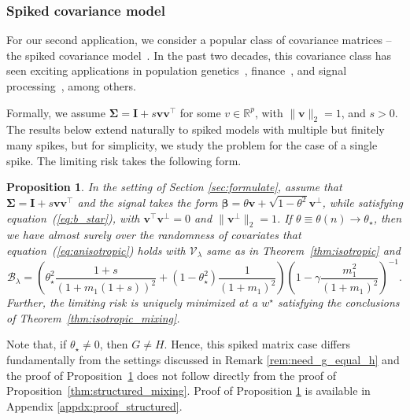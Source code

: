 \documentclass[10pt]{article}
\def\eqref#1{equation~(\ref{#1})}
\newtheorem{prop}{Proposition}
\numberwithin{thm}{section}
\numberwithin{remark}{section}
\numberwithin{ex}{section}
\numberwithin{ass}{section}
\numberwithin{defn}{section}
\numberwithin{lemma}{section}
\numberwithin{corollary}{section}
\numberwithin{prop}{section}
\def \bbeta{\pmb{\beta}}
\newcommand{\bSigma}{ { \Sigma} }
\def\bSigma{{\boldsymbol\Sigma}}
\numberwithin{equation}{section}
\begin{document}
\subsubsection{Spiked covariance model}\label{sec:spike}

For our second application, we consider a popular class of covariance matrices -- the spiked covariance model~\cite{birnbaum2013minimax,johnstone2001distribution,johnstone2020testing}. In the past two decades, this covariance class has seen exciting applications in population genetics~\cite{patterson2006population,price2006principal}, finance~\cite{knight2005linear,ledoit2022power}, and signal processing~\cite{johnstone2009consistency,wang2024nonlinear}, among others.

Formally, we assume $\bSigma = \boldsymbol I + s \boldsymbol v \boldsymbol v^\top$ for some $v \in \mathbb{R}^p$, with $\|\boldsymbol v\|_2=1$, and $s>0$. The results below  extend naturally to spiked models with multiple but finitely many spikes, but for simplicity, we study the problem for the case of a single spike. The limiting risk takes the following form.

\begin{prop}\label{prop:spike}
  In the setting of Section \ref{sec:formulate}, assume that
  $\bSigma = \boldsymbol I + s \boldsymbol v \boldsymbol v^\top$ and the signal takes the form $\bbeta=\theta \boldsymbol v+ \sqrt{1-\theta^2}\boldsymbol v^{\perp}$, while satisfying \eqref{eq:b_star}, with $\boldsymbol v^\top \boldsymbol v^\perp =0$ and $\|\boldsymbol v^\perp\|_2=1$. If $\theta\equiv\theta(n) \rightarrow \theta_\star$, then we have almost surely over the randomness of covariates that  \eqref{eq:anisotropic} holds
  with $\mathcal{V}_{\lambda}$ same as in Theorem~\ref{thm:isotropic} and
  \begin{equation*}
    \mathcal{B}_{\lambda}= \left( \theta_\star^2 \frac{1+s}{(1 + m_1 (1+s))^2} + (1-\theta_\star^2) \frac{1}{(1+m_1)^2}\right)  \left(1 - \gamma \frac{m_1^2}{(1+m_1)^2} \right)^{-1}.
  \end{equation*}
  Further, the limiting risk is uniquely minimized at a $w^\star$ satisfying the conclusions of Theorem~\ref{thm:isotropic_mixing}.
\end{prop}
Note that, if $\theta_\star  \neq 0$, then $G \neq H$. Hence, this spiked matrix case differs fundamentally from the settings discussed in Remark \ref{rem:need_g_equal_h} and  the proof of Proposition~\ref{prop:spike} does not follow directly from the proof of Proposition~\ref{thm:structured_mixing}. Proof of Proposition \ref{prop:spike} is available in Appendix \ref{appdx:proof_structured}.
\end{document}
